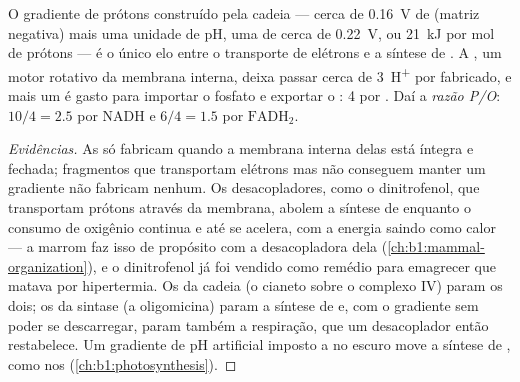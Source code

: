\begin{theorem}\label{thm:b1:respiration-fermentation:chemiosmosis}
O gradiente de prótons construído pela cadeia --- cerca de
\qty{0.16}{V} de  (matriz negativa) mais uma
unidade de pH, uma \emph{} de cerca de \qty{0.22}{V},
ou \qty{21}{kJ} por mol de prótons --- é o único elo entre o transporte
de elétrons e a síntese de . A , um motor rotativo da
membrana interna, deixa passar cerca de \qty{3}{H^+} por  fabricado,
e mais um é gasto para importar o fosfato e exportar o : 4 por .
Daí a \emph{razão P/O}: $10/4 = 2.5$  por NADH e
$6/4 = 1.5$ por $\mathrm{FADH_2}$.
\end{theorem}
\begin{proof}[Evidências]
As  só fabricam  quando a membrana interna delas está
íntegra e fechada; fragmentos que transportam elétrons mas não
conseguem manter um gradiente não fabricam nenhum. Os desacopladores,
como o dinitrofenol, que transportam prótons através da membrana,
abolem a síntese de  enquanto o consumo de oxigênio continua e até se
acelera, com a energia saindo como calor --- a  marrom faz isso
de propósito com a  desacopladora dela
(\cref{ch:b1:mammal-organization}), e o dinitrofenol já foi vendido como
remédio para emagrecer que matava por hipertermia. Os  da
cadeia (o cianeto sobre o complexo IV) param os dois; os  da
sintase (a oligomicina) param a síntese de  e, com o gradiente sem
poder se descarregar, param também a respiração, que um desacoplador
então restabelece. Um gradiente de pH artificial imposto a 
no escuro move a síntese de , como nos 
(\cref{ch:b1:photosynthesis}).
\end{proof}

